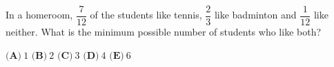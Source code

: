 In a homeroom, $\dfrac7{12}$ of the students like tennis, $\dfrac23$ like badminton and $\dfrac1{12}$ like neither. What is the minimum possible number of students who like both?

$\textbf{(A)}\ $$1$ \qquad $\textbf{(B)}\ $$2$ \qquad $\textbf{(C)}\ $$3$ \qquad $\textbf{(D)}\ $$4$ \qquad $\textbf{(E)}\ $$6$
